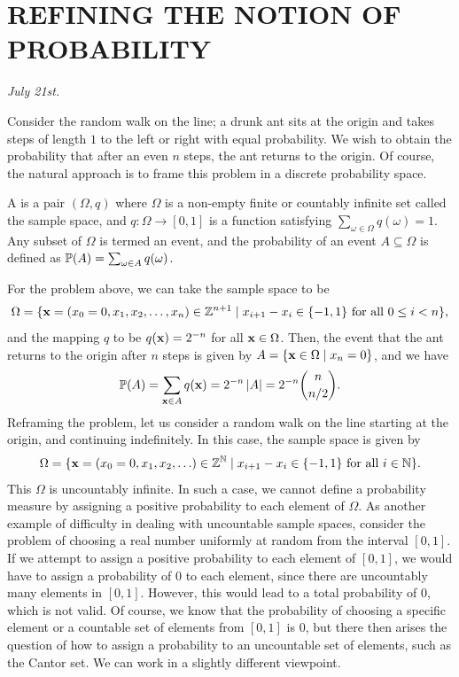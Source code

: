 \chapter{REFINING THE NOTION OF PROBABILITY}

\textit{July 21st.}

Consider the random walk on the line; a drunk ant sits at the origin and takes steps of length $1$ to the left or right with equal probability. We wish to obtain the probability that after an even $n$ steps, the ant returns to the origin. Of course, the natural approach is to frame this problem in a discrete probability space.

\begin{definition}
    A  is a pair $(\Omega,q)$ where $\Omega$ is a non-empty finite or countably infinite set called the sample space, and $q:\Omega\to[0,1]$ is a function satisfying $\sum_{\omega\in\Omega}q(\omega)=1$. Any subset of $\Omega$ is termed an event, and the probability of an event $A \subseteq \Omega$ is defined as $\mathbb{P}(A) = \sum_{\omega\in A}q(\omega)$.
\end{definition}

For the problem above, we can take the sample space to be
\begin{align}
    \Omega = \{\mathbf{x}=(x_{0}=0,x_{1},x_{2},\ldots,x_{n}) \in \mathbb{Z}^{n+1} \mid x_{i+1}-x_{i} \in \{-1,1\} \text{ for all } 0 \leq i < n\},
\end{align}
and the mapping $q$ to be $q(\mathbf{x}) = 2^{-n}$ for all $\mathbf{x} \in \Omega$. Then, the event that the ant returns to the origin after $n$ steps is given by $A = \{\mathbf{x} \in \Omega \mid x_{n} = 0\}$, and we have
\begin{align}
    \mathbb{P}(A) = \sum_{\mathbf{x} \in A} q(\mathbf{x}) = 2^{-n} \left| A \right| = 2^{-n} \binom{n}{n/2}.
\end{align}
Reframing the problem, let us consider a random walk on the line starting at the origin, and continuing indefinitely. In this case, the sample space is given by
\begin{align}
    \Omega = \{\mathbf{x}=(x_{0}=0,x_{1},x_{2},\ldots) \in \mathbb{Z}^{\mathbb{N}} \mid x_{i+1}-x_{i} \in \{-1,1\} \text{ for all } i \in \mathbb{N}\}.
\end{align}
This $\Omega$ is uncountably infinite. In such a case, we cannot define a probability measure by assigning a positive probability to each element of $\Omega$. As another example of difficulty in dealing with uncountable sample spaces, consider the problem of choosing a real number uniformly at random from the interval $[0,1]$. If we attempt to assign a positive probability to each element of $[0,1]$, we would have to assign a probability of $0$ to each element, since there are uncountably many elements in $[0,1]$. However, this would lead to a total probability of $0$, which is not valid. Of course, we know that the probability of choosing a specific element or a countable set of elements from $[0,1]$ is $0$, but there then arises the question of how to assign a probability to an uncountable set of elements, such as the Cantor set. We can work in a slightly different viewpoint.


